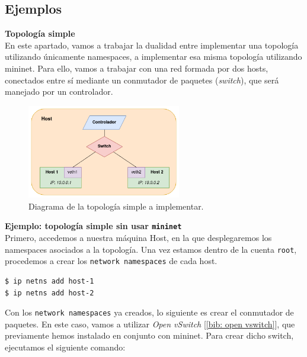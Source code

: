 \documentclass[a4paper, oneside, 12pt]{book}
\begin{document}
	\subsection{Ejemplos}
	
	\noindent \textbf{Topología simple}\\
	
	\noindent En este apartado, vamos a trabajar la dualidad entre implementar una topología utilizando únicamente namespaces, a implementar esa misma topología utilizando mininet. Para ello, vamos a trabajar con una red formada por dos hosts, conectados entre sí mediante un conmutador de paquetes (\textit{switch}), que será manejado por un controlador. \\
	
	\begin{figure}[h!]
		\begin{center}
			\includegraphics[width=0.6\textwidth]{img/ns_mn_single.png}
			\caption{Diagrama de la topología simple a implementar.}
		\end{center}
	\end{figure}
	
	\noindent \textbf{\large Ejemplo: topología simple sin usar \texttt{mininet}}\\
	
	\noindent Primero, accedemos a nuestra máquina Host, en la que desplegaremos los namespaces asociados a la topología. Una vez estamos dentro de la cuenta \texttt{root}, procedemos a crear los \texttt{network namespaces} de cada host. 
	
	\begin{verbatim}
$ ip netns add host-1
$ ip netns add host-2
	\end{verbatim}

	\noindent Con los \texttt{network namespaces} ya creados, lo siguiente es crear el conmutador de paquetes. En este caso, vamos a utilizar \textit{Open vSwitch} [\ref{bib: open vswitch}], que previamente hemos instalado en conjunto con mininet. Para crear dicho switch, ejecutamos el siguiente comando:
	
\end{document}
